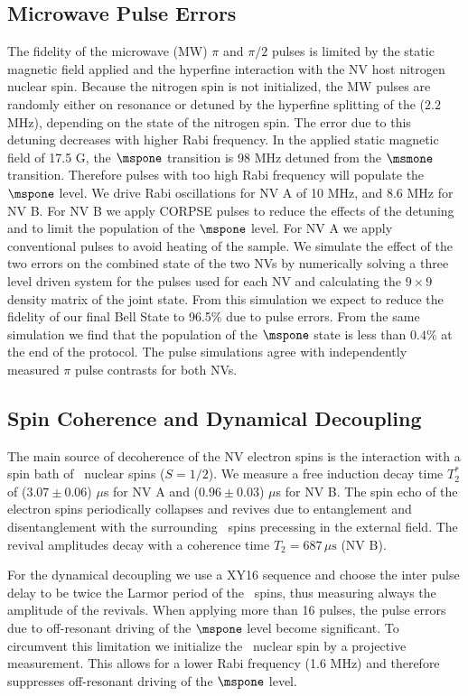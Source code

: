 \subsection{Microwave Pulse Errors}
The fidelity of the microwave (MW) $\pi$ and $\pi/2$ pulses is limited by the static magnetic field applied and the hyperfine interaction with the NV host nitrogen nuclear spin. Because the nitrogen spin is not initialized, the MW pulses are randomly either on resonance or detuned by the hyperfine splitting of the \nfourteen ($2.2$\,MHz), depending on the state of the nitrogen spin. The error due to this detuning decreases with higher Rabi frequency. In the applied static magnetic field of 17.5 G, the $\mspone$ transition is 98 MHz detuned from the $\msmone$ transition. Therefore pulses with too high Rabi frequency will populate the $\mspone$ level. We drive Rabi oscillations for NV A of 10 MHz, and 8.6 MHz for NV B. For NV B we apply CORPSE pulses\cite{2003PhRvA..67d2308C} to reduce the effects of the detuning and to limit the population of the $\mspone$ level. For NV A we apply conventional pulses to avoid heating of the sample. We simulate the effect of the two errors on the combined state of the two NVs by numerically solving a three level driven system for the pulses used for each NV and calculating the $9\times9$ density matrix of the joint state. From this simulation we expect to reduce the fidelity of our final Bell State to 96.5$\%$  due to pulse errors. From the same simulation we find that the population of the $\mspone$ state is less than $0.4\%$ at the end of the protocol. The pulse simulations agree with independently measured $\pi$ pulse contrasts for both NVs.

\subsection{Spin Coherence and Dynamical Decoupling}
The main source of decoherence of the NV electron spins is the interaction with a spin bath of \cthirteen\ nuclear spins ($S = 1/2$). We measure a free induction decay time $T_2^{*}$ of ($3.07 \pm 0.06 $) $\mu$s for NV A and ($0.96 \pm 0.03$) $\mu$s for NV B. The spin echo of the electron spins periodically collapses and revives due to entanglement and disentanglement with the surrounding \cthirteen\ spins precessing in the external field\cite{Childress2006}. The revival amplitudes decay with a coherence time $T_2=687\,\mu\mathrm s$ (NV B).

For the dynamical decoupling we use a XY16 sequence\cite{Gullion:1990uj} and choose the inter pulse delay to be twice the Larmor period of the \cthirteen\ spins, thus measuring always the amplitude of the revivals. When applying more than 16 pulses, the pulse errors due to off-resonant driving of the $\mspone$ level become significant. To circumvent this limitation we initialize the \nfourteen\ nuclear spin by a projective measurement\cite{Robledo:2011fs}. This allows for a lower Rabi frequency (1.6 MHz) and therefore suppresses off-resonant driving of the $\mspone$ level.

